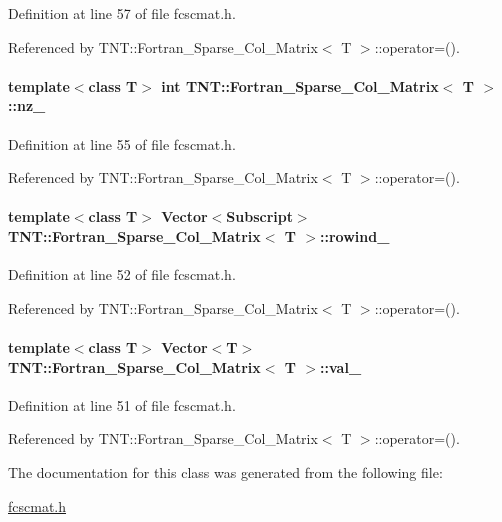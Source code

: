 Definition at line 57 of file fcscmat.h.



Referenced by TNT::Fortran\_\-Sparse\_\-Col\_\-Matrix$<$ T $>$::operator=().

\paragraph[{nz\_\-}]{\setlength{\rightskip}{0pt plus 5cm}template$<$class T$>$ int {\bf TNT::Fortran\_\-Sparse\_\-Col\_\-Matrix}$<$ T $>$::{\bf nz\_\-}}\hfill\label{class_t_n_t_1_1_fortran___sparse___col___matrix_aa954fe021dc8343164265895b88b4638}


Definition at line 55 of file fcscmat.h.



Referenced by TNT::Fortran\_\-Sparse\_\-Col\_\-Matrix$<$ T $>$::operator=().

\paragraph[{rowind\_\-}]{\setlength{\rightskip}{0pt plus 5cm}template$<$class T$>$ {\bf Vector}$<${\bf Subscript}$>$ {\bf TNT::Fortran\_\-Sparse\_\-Col\_\-Matrix}$<$ T $>$::{\bf rowind\_\-}}\hfill\label{class_t_n_t_1_1_fortran___sparse___col___matrix_a7b1d2caa6bc2b26bba31dabe76ad8e6b}


Definition at line 52 of file fcscmat.h.



Referenced by TNT::Fortran\_\-Sparse\_\-Col\_\-Matrix$<$ T $>$::operator=().

\paragraph[{val\_\-}]{\setlength{\rightskip}{0pt plus 5cm}template$<$class T$>$ {\bf Vector}$<$T$>$ {\bf TNT::Fortran\_\-Sparse\_\-Col\_\-Matrix}$<$ T $>$::{\bf val\_\-}}\hfill\label{class_t_n_t_1_1_fortran___sparse___col___matrix_a4e0a5a75adbb528cb76f8a2fe36d5ded}


Definition at line 51 of file fcscmat.h.



Referenced by TNT::Fortran\_\-Sparse\_\-Col\_\-Matrix$<$ T $>$::operator=().



The documentation for this class was generated from the following file:\begin{DoxyCompactItemize}
\item 
\hyperlink{fcscmat_8h}{fcscmat.h}\end{DoxyCompactItemize}
